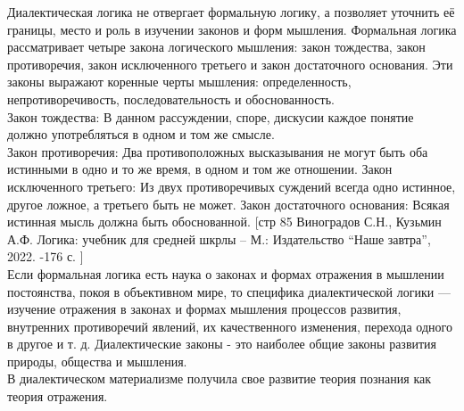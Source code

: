 \documentclass[a4paper,12pt]{report}
\begin{document}
Диалектическая логика не отвергает формальную логику, а позволяет уточнить её границы, место и роль в изучении законов и форм мышления. Формальная логика рассматривает четыре закона логического мышления: закон тождества, закон противоречия, закон исключенного третьего и закон достаточного основания. Эти законы выражают коренные черты мышления: определенность, непротиворечивость, последовательность и обоснованность.\\
Закон тождества: В данном рассуждении, споре, дискусии каждое понятие должно употребляться в одном и том же смысле.\\
Закон противоречия: Два противоположных высказывания не могут быть оба истинными в одно и то же время, в одном и том же отношении.
Закон исключенного третьего: Из двух противоречивых суждений всегда одно истинное, другое ложное, а третьего быть не может.
Закон достаточного основания: Всякая истинная мысль должна быть обоснованной. [стр 85 Виноградов С.Н., Кузьмин А.Ф. Логика: учебник для средней шкрлы – М.: Издательство “Наше завтра”, 2022. -176 с. ]\\
	Если формальная логика есть наука о законах и формах отражения в мышлении постоянства, покоя в объективном мире, то специфика диалектической логики — изучение отражения в законах и формах мышления процессов развития, внутренних противоречий явлений, их качественного изменения, перехода одного в другое и т. д.  Диалектические законы - это наиболее общие законы развития природы, общества и мышления.\\
В диалектическом материализме получила свое развитие теория познания как теория отражения.\\
\end{document}
